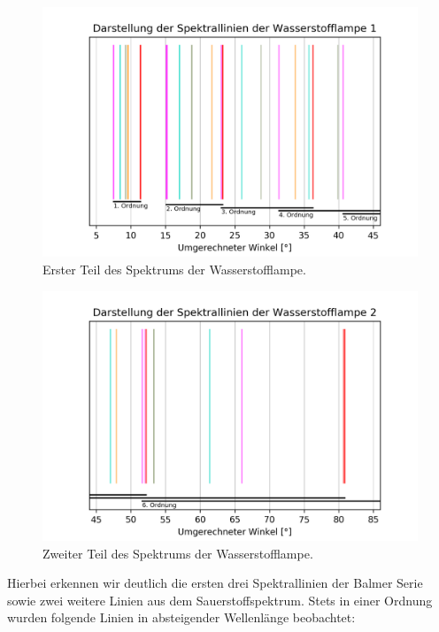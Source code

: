\documentclass[]{article}
\begin{document}
\begin{figure}[H]
\centering
\includegraphics[width=1\textwidth]{Plots/HD_Linien_0.png}
\caption{ Erster Teil des Spektrums der Wasserstofflampe. }
\label{fig:H Lines 0}
\end{figure}

\begin{figure}[H]
\centering
\includegraphics[width=1\textwidth]{Plots/HD_Linien_1.png}
\caption{ Zweiter Teil des Spektrums der Wasserstofflampe.}
\label{fig:H Lines 1}
\end{figure}

Hierbei erkennen wir deutlich die ersten drei Spektrallinien der Balmer Serie sowie zwei weitere Linien aus dem Sauerstoffspektrum. Stets in einer Ordnung wurden folgende Linien in absteigender Wellenlänge beobachtet:

\end{document}
